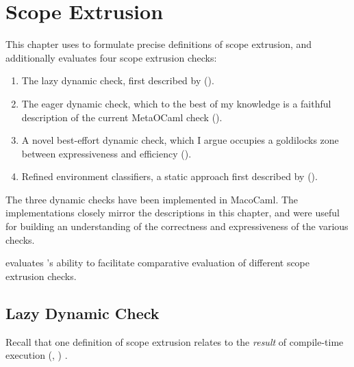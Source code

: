 \newcommand{\scoped}[2][\Theta]{\textsf{Scoped}_{{#1}, {#2}}}

\chapter{Scope Extrusion}\label{chapter:scope-extrusion}
This chapter uses \calculusName{} to formulate precise definitions of scope extrusion, and additionally evaluates four scope extrusion checks: 
\begin{enumerate}
  \item The lazy dynamic check, first described by \citet{kiselyov-14} ().
  \item The eager dynamic check, which to the best of my knowledge is a faithful description of the current MetaOCaml check ().
  \item A novel best-effort dynamic check, which I argue occupies a goldilocks zone between expressiveness and efficiency ().
  \item Refined environment classifiers, a static approach first described by \citet{kiselyov-16} ().
\end{enumerate}
The three dynamic checks have been implemented in MacoCaml. The implementations closely mirror the descriptions in this chapter, and were useful for building an understanding of the correctness and expressiveness of the various checks. 

 evaluates \calculusName{}'s ability to facilitate comparative evaluation of different scope extrusion checks.

\section{Lazy Dynamic Check}\label{section:lazy-dynamic-check-formal}
Recall that one definition of scope extrusion relates to the \textit{result} of compile-time execution (, ) \citep{kiselyov-14}. 



